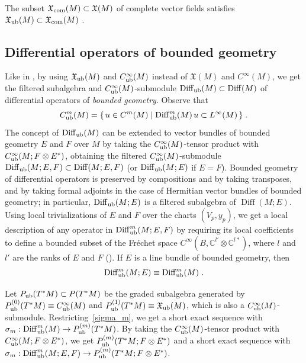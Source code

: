 \documentclass{memo-l}
\theoremstyle{plain}
\theoremstyle{definition}
\theoremstyle{remark}
\newcommand{\C}{\mathbb{C}}
\newcommand{\fX}{\mathfrak{X}}
\newcommand{\Diff}{\operatorname{Diff}}
\newcommand{\Diffub}{\Diff_{\text{\rm ub}}}
\newcommand{\Cinftyub}{C^\infty_{\text{\rm ub}}}
\newcommand{\fXcom}{\fX_{\text{\rm com}}}
\newcommand{\fXub}{\fX_{\text{\rm ub}}}
\numberwithin{section}{chapter}
\numberwithin{equation}{section}%
\begin{document}
The subset $\fXcom(M)\subset\fX(M)$ of complete vector fields satisfies $\fXub(M)\subset\fXcom(M)$ \cite[Proposition~3.8]{AlvKordyLeichtnam2020}.




\subsection{Differential operators of bounded geometry}\label{ss: diff ops of bd geom}

Like in , by using $\fXub(M)$ and $\Cinftyub(M)$ instead of $\fX(M)$ and $C^\infty(M)$, we get the filtered subalgebra and $\Cinftyub(M)$-submodule $\Diffub(M)\subset\Diff(M)$ of differential operators of \emph{bounded geometry}. Observe that
\begin{equation}\label{C^m_ub(M)}
C^m_{\text{\rm ub}}(M)=\{\,u\in C^m(M)\mid\Diffub^m(M)\,u\subset L^\infty(M)\,\}\;.
\end{equation}
The concept of $\Diffub(M)$ can be extended to vector bundles of bounded geometry $E$ and $F$ over $M$ by taking the $\Cinftyub(M)$-tensor product with $\Cinftyub(M;F\otimes E^*)$, obtaining the filtered $\Cinftyub(M)$-submodule $\Diffub(M;E,F)\subset\Diff(M;E,F)$ (or $\Diffub(M;E)$ \index{$\Diffub(M;E)$} if $E=F$). Bounded geometry of differential operators is preserved by compositions and by taking transposes, and by taking formal adjoints in the case of Hermitian vector bundles of bounded geometry; in particular, $\Diffub(M;E)$ is a filtered subalgebra of $\Diff(M;E)$. Using local trivializations of $E$ and $F$ over the charts $(V_p,y_p)$, we get a local description of any operator in $\Diffub^m(M;E,F)$ by requiring its local coefficients to define a bounded subset of the Fr\'echet space $C^\infty(B,\C^{l'}\otimes\C^{l*})$, where $l$ and $l'$ are the ranks of $E$ and $F$ (). If $E$ is a line bundle of bounded geometry, then \cite[Eq.~(2.24)]{AlvKordyLeichtnam-conormal}
\begin{equation}\label{Diffub^m(M E) equiv Diffub^m(M)}
\Diffub^m(M;E)\equiv\Diffub^m(M)\;.
\end{equation}

Let $P_{\text{\rm ub}}(T^*M)\subset P(T^*M)$ be the graded subalgebra generated by $P_{\text{\rm ub}}^{(0)}(T^*M)\equiv \Cinftyub(M)$ and $P_{\text{\rm ub}}^{(1)}(T^*M)\equiv \fXub(M)$, which is also a $\Cinftyub(M)$-submodule. Restricting~\eqref{sigma_m}, we get a short exact sequence with $\sigma_m:\Diffub^m(M)\to P_{\text{\rm ub}}^{(m)}(T^*M)$. By taking the $\Cinftyub(M)$-tensor product with $\Cinftyub(M;F\otimes E^*)$, we get $P_{\text{\rm ub}}^{(m)}(T^*M;F\otimes E^*)$ and a short exact sequence with $\sigma_m:\Diffub^m(M;E,F)\to P_{\text{\rm ub}}^{(m)}(T^*M;F\otimes E^*)$. 
\end{document}
